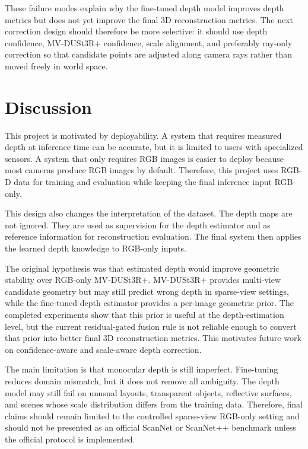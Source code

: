\documentclass[12pt,a4paper]{article}
\newcommand{\mvdp}{MV-DUSt3R+}
\begin{document}
These failure modes explain why the fine-tuned depth model improves depth metrics but does not yet improve the final 3D reconstruction metrics. The next correction design should therefore be more selective: it should use depth confidence, \mvdp{} confidence, scale alignment, and preferably ray-only correction so that candidate points are adjusted along camera rays rather than moved freely in world space.

\section{Discussion}
This project is motivated by deployability. A system that requires measured depth at inference time can be accurate, but it is limited to users with specialized sensors. A system that only requires RGB images is easier to deploy because most cameras produce RGB images by default. Therefore, this project uses RGB-D data for training and evaluation while keeping the final inference input RGB-only.

This design also changes the interpretation of the dataset. The depth maps are not ignored. They are used as supervision for the depth estimator and as reference information for reconstruction evaluation. The final system then applies the learned depth knowledge to RGB-only inputs.

The original hypothesis was that estimated depth would improve geometric stability over RGB-only \mvdp{}. \mvdp{} provides multi-view candidate geometry but may still predict wrong depth in sparse-view settings, while the fine-tuned depth estimator provides a per-image geometric prior. The completed experiments show that this prior is useful at the depth-estimation level, but the current residual-gated fusion rule is not reliable enough to convert that prior into better final 3D reconstruction metrics. This motivates future work on confidence-aware and scale-aware depth correction.

The main limitation is that monocular depth is still imperfect. Fine-tuning reduces domain mismatch, but it does not remove all ambiguity. The depth model may still fail on unusual layouts, transparent objects, reflective surfaces, and scenes whose scale distribution differs from the training data. Therefore, final claims should remain limited to the controlled sparse-view RGB-only setting and should not be presented as an official ScanNet or ScanNet++ benchmark unless the official protocol is implemented.
\end{document}
